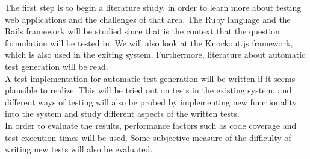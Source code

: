 
The first step is to begin a literature study, in order to learn more
about testing web applications and the challenges of that area. The Ruby
language and the Rails framework will be studied since that is the
context that the question formulation will be tested in. We will also
look at the Knockout.js framework, which is also used in the exiting
system. Furthermore, literature about automatic test generation will be
read.\\

A test implementation for automatic test generation will be written if
it seems plausible to realize. This will be tried out on tests in the
existing system, and different ways of testing will also be probed by
implementing new functionality into the system and study different
aspects of the written tests.\\

In order to evaluate the results, performance factors such as code
coverage and test execution times will be used. Some subjective measure
of the difficulty of writing new tests will also be evaluated.\\
